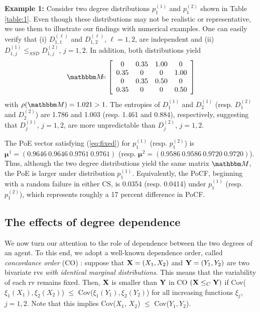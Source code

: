 \documentclass[10pt, journal, compsoc]{IEEEtran}
\newcommand {\bM} {{\mathbbm M}}
\newcommand {\bX} {{\bf X}}
\newcommand {\bY} {{\bf Y}}
\newcommand {\bmu} {\boldsymbol{\mu}}
\newcommand{\beqan}{\begin{eqnarray*}}
\newcommand{\eeqan}{\end{eqnarray*}}
\newcommand{\myeq}{& \hspace{-0.1in} = & \hspace{-0.1in}}
\begin{document}
{\bf Example 1:} 
Consider two degree distributions 
$p^{(1)}_1$ and $p^{(2)}_1$ shown in Table
\ref{table:1}. Even though these distributions 
may not be realistic or representative, we use them 
to illustrate our findings with numerical
examples. One can 
easily verify that (i) $D^{(\ell)}_{1,1}$ and 
$D^{(\ell)}_{1,2}$, $\ell = 1, 2$, are independent 
and (ii) $D^{(1)}_{1,j} \leq_{SSD}
D^{(2)}_{1,j}$, $j = 1, 2$. In addition, both
distributions yield 
\beqan
\bM
\myeq \left[ 
	\begin{array}{cccc}
	0 & 0.35 & 1.00 & 0 \\
	0.35 & 0 & 0 & 1.00 \\
	0 & 0.35 & 0.50 & 0 \\
	0.35 & 0 & 0 & 0.50 
	\end{array}
\right]
\eeqan
with $\rho(\bM) = 1.021 > 1$. The 
entropies of $D^{(1)}_1$ and $D^{(1)}_2$
(resp. $D^{(2)}_1$ and $D^{(2)}_2$) are
1.786 and 1.003 (resp. 1.461 and 0.884), 
respectively, suggesting that $D^{(1)}_j$, 
$j = 1, 2$, are more unpredictable than 
$D^{(2)}_j$, $j = 1, 2$.  

The PoE vector satisfying (\ref{eq:fixed}) for 
$p^{(1)}_1$ (resp. $p^{(2)}_1$) is $\bmu^1 = 
(0.9646 \ 0.9646 \ 0.9761 \ 0.9761)$
(resp. $\bmu^2 = (0.9586 \ 
0.9586 \ 0.9720 \ 0.9720)$).
Thus, although the two degree distributions yield
the same matrix $\bM$, the PoE is larger
under distribution $p^{(1)}_1$. Equivalently, 
the PoCF, beginning
with a random failure in either CS, 
is 0.0354 (resp. 0.0414) 
under $p^{(1)}_1$ (resp. $p^{(2)}_1$), which
represents roughly a 17 percent difference
in PoCF.   



\subsection{The effects of degree dependence}

We now turn our attention to the role of 
dependence between the two degrees of an agent. 
To this end, we adopt a well-known dependence
order, called {\em concordance order} (CO)
\cite{MullerStoyan}: suppose that $\bX
= (X_1, X_2)$ and $\bY = (Y_1, Y_2)$ are
two bivariate rvs {\em with identical marginal 
distributions}. This 
means that the variability of each rv 
remains fixed. Then, $\bX$ is smaller than 
$\bY$ in CO $(\bX \leq_C \bY)$ if 
Cov($\xi_1(X_1), \xi_2(X_2)$) $\leq$
Cov($\xi_1(Y_1), \xi_2(Y_2)$) for all 
increasing functions $\xi_j$, $j = 1, 2$. 
Note that this implies Cov($X_1$, $X_2$)
$\leq$ Cov($Y_1, Y_2$). 
\end{document}
